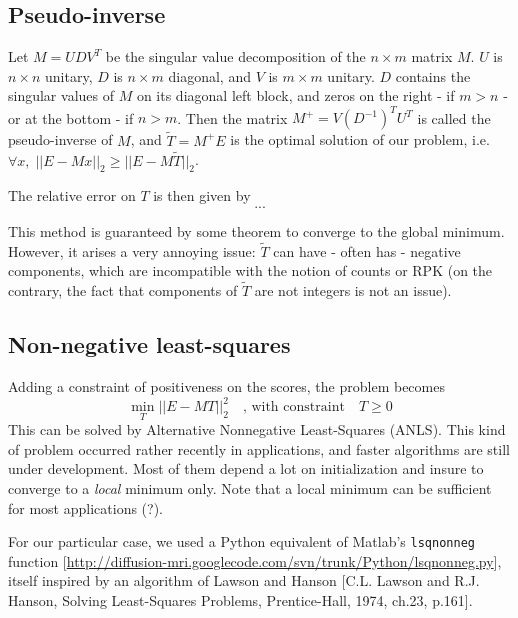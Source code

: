 \documentclass[a4paper,11pt]{article}
\begin{document}
\subsection{Pseudo-inverse}

Let $M = UDV^T$ be the singular value decomposition of the $n\times m$ matrix $M$. $U$ is $n\times n$ unitary, $D$ is $n\times m$ diagonal, and $V$ is $m\times m$ unitary. $D$ contains the singular values of $M$ on its diagonal left block, and zeros on the right - if $m>n$ - or at the bottom - if $n>m$.
Then the matrix $M^{+} = V(D^{-1})^T U^T$ is called the pseudo-inverse of $M$, and $\tilde{T} = M^{+}E$ is the optimal solution of our problem, i.e. $\forall x, \; ||E-Mx||_2 \ge ||E-M\tilde{T}||_2$.

The relative error on $T$ is then given by 
$$ ... $$

This method is guaranteed by some theorem to converge to the global minimum. However, it arises a very annoying issue: $\tilde{T}$ can have - often has - negative components, which are incompatible with the notion of counts or RPK (on the contrary, the fact that components of $\tilde{T}$ are not integers is not an issue).

\subsection{Non-negative least-squares}

Adding a constraint of positiveness on the scores, the problem becomes
$$ \min_T ||E-MT||_2^2 \quad \text{, with constraint} \quad T \geq 0 $$
This can be solved by Alternative Nonnegative Least-Squares (ANLS). This kind of problem occurred rather recently in applications, and faster algorithms are still under development. Most of them depend a lot on initialization and insure to converge to a \emph{local} minimum only. Note that a local minimum can be sufficient for most applications (?).

For our particular case, we used a Python equivalent of Matlab's \texttt{lsqnonneg} function [\url{http://diffusion-mri.googlecode.com/svn/trunk/Python/lsqnonneg.py}], itself inspired by an algorithm of Lawson and Hanson [C.L. Lawson and R.J. Hanson, Solving Least-Squares Problems, Prentice-Hall, 1974, ch.23, p.161].
\end{document}
